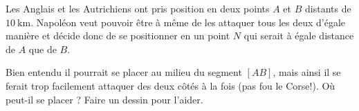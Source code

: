 

Les Anglais et les Autrichiens ont pris position en deux points \( A\) et \( B\) distants de \( \SI{10}{\kilo\meter}\). Napoléon veut pouvoir être à même de les attaquer tous les deux d'égale manière et décide donc de se positionner en un point $N$ qui serait à égale distance de \( A\) que de \( B\).

Bien entendu il pourrait se placer au milieu du segment \( [AB]\), mais ainsi il se ferait trop facilement attaquer des deux côtés à la fois (pas fou le Corse!). Où peut-il se placer ? Faire un dessin pour l'aider.
